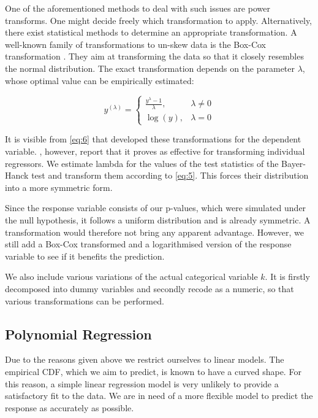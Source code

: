 \documentclass[12pt,a4paper]{article}
\begin{document}
One of the aforementioned methods to deal with such issues are power
transforms. One might decide freely which transformation to apply.
Alternatively, there exist statistical methods to determine an
appropriate transformation. A well-known family of transformations to
un-skew data is the Box-Cox transformation \autocite{Boxcox_1964}. They
aim at transforming the data so that it closely resembles the normal
distribution. The exact transformation depends on the parameter
\(\lambda\), whose optimal value can be empirically estimated:

\begin{equation}
y^{(\lambda)} =
    \begin{cases}
    \frac{y^{\lambda} - 1}{\lambda}, & \lambda \neq 0 \\
    \log{(y)}, & \lambda = 0
    \end{cases}
\label{eq:6}
\end{equation}

It is visible from \eqref{eq:6} that \textcite{Boxcox_1964} developed
these transformations for the dependent variable. \textcite{Kuhn_2013},
however, report that it proves as effective for transforming individual
regressors. We estimate lambda for the values of the test statistics of
the Bayer-Hanck test and transform them according to \eqref{eq:5}. This
forces their distribution into a more symmetric form.

Since the response variable consists of our p-values, which were
simulated under the null hypothesis, it follows a uniform distribution
and is already symmetric. A transformation would therefore not bring any
apparent advantage. However, we still add a Box-Cox transformed and a
logarithmised version of the response variable to see if it benefits the
prediction.

We also include various variations of the actual categorical variable
\(k\). It is firstly decomposed into dummy variables and secondly recode
as a numeric, so that various transformations can be performed.

\hypertarget{polynomial-regression}{%
\subsection{Polynomial Regression}\label{polynomial-regression}}

Due to the reasons given above we restrict ourselves to linear models.
The empirical \ac{CDF}, which we aim to predict, is known to have a
curved shape. For this reason, a simple linear regression model is very
unlikely to provide a satisfactory fit to the data. We are in need of a
more flexible model to predict the response as accurately as possible.
\end{document}
